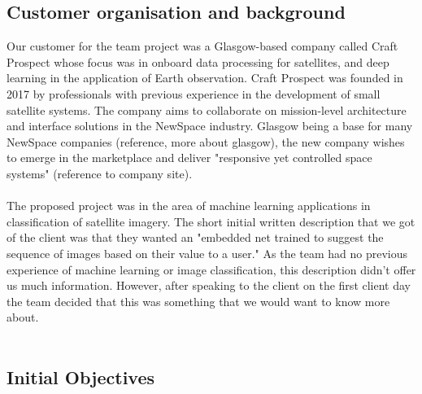 \documentclass{l3proj}
\begin{document}

\subsection*{Customer organisation and background}

Our customer for the team project was a Glasgow-based company called Craft Prospect whose focus was in onboard data processing for satellites, and deep learning in the application of Earth observation. Craft Prospect was founded in 2017 by professionals with previous experience in the development of small satellite systems. The company aims to collaborate on mission-level architecture and interface solutions in the NewSpace industry. Glasgow being a base for many NewSpace companies (reference, more about glasgow), the new company wishes to emerge in the marketplace and deliver "responsive yet controlled space systems" (reference to company site).
\\\\
The proposed project was in the area of machine learning applications in classification of satellite imagery. The short initial written description that we got of the client was that they wanted an "embedded net trained to suggest the sequence of images based on their value to a user." As the team had no previous experience of machine learning or image classification, this description didn't offer us much information. However, after speaking to the client on the first client day the team decided that this was something that we would want to know more about.
\\\\

\subsection*{Initial Objectives}
\end{document}

